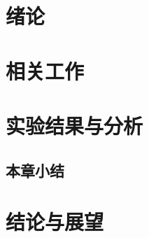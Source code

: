 \documentclass[12pt]{article}
\title{}
\author{王伟钊}
\date{\today}
\begin{document}
\maketitle

\begin{abstract}
    
\end{abstract}

\newpage

\tableofcontents

\newpage

\section{绪论}

\newpage

\section{相关工作}

\newpage

\section{实验结果与分析}



\subsection{本章小结}


\newpage
\section{结论与展望}




\appendix
\end{document}
